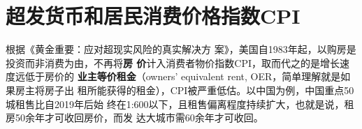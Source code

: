
\section{超发货币和居民消费价格指数CPI}

根据《黄金重要：应对超现实风险的真实解决方
案》\cite{piepenburg2022gold}，美国自1983年起，以购房是投资而非消费为由，不再将\textbf{房
  价}计入消费者物价指数CPI，取而代之的是增长速度远低于房价的%
\textbf{业主等价租金}（owners’ equivalent rent, OER，简单理解就是如果房主将房子出
租所能获得的租金），CPI被严重低估。以中国为例，中国重点50城租售比自2019年后始
终在1:600以下，且租售偏离程度持续扩大，也就是说，租房50余年才可收回房价，而发
达大城市需60余年才可收回。


